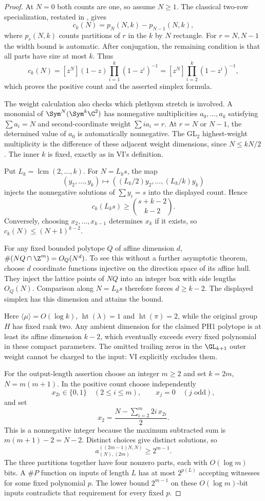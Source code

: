 \documentclass[11pt,a4paper]{article}
\theoremstyle{named}\newtheorem{finding}{Finding}[section]
\theoremstyle{definition}\newtheorem{definition}[finding]{Definition}
\theoremstyle{remark}\newtheorem{remark}[finding]{Remark}
\begin{document}
\begin{proof}
At $N=0$ both counts are one, so assume $N\ge1$.
The classical two-row specialization, restated in
\cite[Lemma~1.3, p.~2]{PPS}, gives
\[
 c_k(N)=p_N(N,k)-p_{N-1}(N,k),
\]
where $p_r(N,k)$ counts partitions of $r$ in the $k$ by $N$ rectangle.
For $r=N,N-1$ the width bound is automatic. After conjugation, the
remaining condition is that all parts have size at most $k$. Thus
\[
 c_k(N)
 =[z^N](1-z)\prod_{i=1}^k(1-z^i)^{-1}
 =[z^N]\prod_{i=2}^k(1-z^i)^{-1},
\]
which proves the positive count and the asserted simplex formula.

The weight calculation also checks which plethysm stretch is involved.
A monomial of $\Sym^N(\Sym^k\C^2)$ has nonnegative multiplicities
$a_0,\ldots,a_k$ satisfying $\sum a_i=N$ and second-coordinate weight
$\sum ia_i=r$. At $r=N$ or $N-1$, the determined value of $a_0$ is
automatically nonnegative. The GL$_2$ highest-weight multiplicity is
the difference of these adjacent weight dimensions, since
$N\le kN/2$. The inner $k$ is fixed, exactly as in VI's definition.

Put $L_k=\operatorname{lcm}(2,\ldots,k)$. For $N=L_ks$, the map
\[
 (y_2,\ldots,y_k)\longmapsto
       ((L_k/2)y_2,\ldots,(L_k/k)y_k)
\]
injects the nonnegative solutions of $\sum y_i=s$ into the displayed
count. Hence
\[
 c_k(L_ks)\ge\binom{s+k-2}{k-2}.
\]
Conversely, choosing $x_2,\ldots,x_{k-1}$ determines $x_k$ if it
exists, so $c_k(N)\le(N+1)^{k-2}$.

For any fixed bounded polytope $Q$ of affine dimension $d$,
$\#(NQ\cap\Z^m)=O_Q(N^d)$. To see this without a further asymptotic
theorem, choose $d$ coordinate functions injective on the direction
space of its affine hull. They inject the lattice points of $NQ$
into an integer box with side lengths $O_Q(N)$.
Comparison along $N=L_ks$ therefore forces $d\ge k-2$.
The displayed simplex has this dimension and attains the bound.

Here $\langle\mu\rangle=O(\log k)$,
$\operatorname{ht}(\lambda)=1$ and
$\operatorname{ht}(\pi)=2$, while the original group $H$ has fixed
rank two. Any ambient dimension for the claimed PH1 polytope is at
least its affine dimension $k-2$, which eventually exceeds every
fixed polynomial in these compact parameters. The omitted trailing
zeros in the $\GL_{k+1}$ outer weight cannot be charged to the input:
VI explicitly excludes them.

For the output-length assertion choose an integer $m\ge2$ and set
$k=2m$, $N=m(m+1)$. In the positive count choose independently
\[
 x_{2i}\in\{0,1\}\quad(2\le i\le m),\qquad
 x_j=0\quad(j\text{ odd}),
\]
and set
\[
 x_2=\frac{N-\sum_{i=2}^m2i\,x_{2i}}2.
\]
This is a nonnegative integer because the maximum subtracted sum
is $m(m+1)-2=N-2$. Distinct choices give distinct solutions, so
\[
 a^{((2m-1)N,N)}_{(N),(2m)}\ge2^{m-1}.
\]
The three partitions together have four nonzero parts, each with
$O(\log m)$ bits. A $\#P$ function on inputs of length $L$ has at
most $2^{p(L)}$ accepting witnesses for some fixed polynomial $p$.
The lower bound $2^{m-1}$ on these $O(\log m)$-bit inputs contradicts
that requirement for every fixed $p$.
\end{proof}
\end{document}
